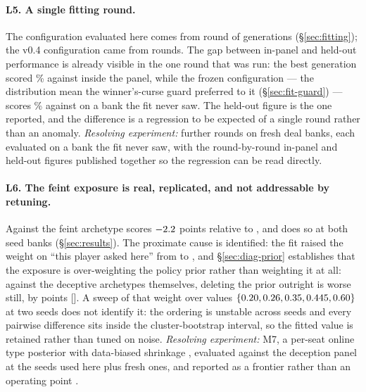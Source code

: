 \paragraph{L5. A single fitting round.} The configuration evaluated here comes
from \numFitRounds{} round of \numFitGens{} generations
(\S\ref{sec:fitting}); the v0.4 configuration came from
\numVfourFitRounds{} rounds.
The gap between in-panel and held-out performance is already visible in the one
round that was run: the best generation scored \numFitWorst\% against \vfour{}
inside the panel, while the frozen configuration --- the distribution mean the
winner's-curse guard preferred to it (\S\ref{sec:fit-guard}) --- scores
\numPanelVfiveVfour\% against \vfour{} on a bank the fit never saw.
The held-out figure is the one reported, and the difference is a regression to be
expected of a single round rather than an anomaly. \emph{Resolving experiment:}
further rounds on fresh deal banks, each evaluated on a bank the fit never saw,
with the round-by-round in-panel and held-out figures published together so the
regression can be read directly.

\paragraph{L6. The feint exposure is real, replicated, and not addressable by
retuning.} Against the feint archetype \vfive{} scores $-2.2$
points relative to \vfour{}, and does so at both seed banks
(\S\ref{sec:results}). The proximate
cause is identified: the fit raised the weight on ``this player asked here'' from
\numPriorThetaFour{} to \numPriorThetaFive{}, and \S\ref{sec:diag-prior}
establishes that the exposure is over-weighting the policy prior rather than
weighting it at all: against the deceptive archetypes themselves, deleting the
prior outright is worse still, by
\numPriorDeleteCost{} points [\numPriorDeleteCI]. A sweep of that weight over \numThetaSweepN{} values
$\{0.20, 0.26, 0.35, 0.445, 0.60\}$ at two seeds does not identify it: the ordering is unstable
across seeds and every pairwise difference sits inside the cluster-bootstrap
interval, so the fitted value is retained rather than tuned on noise.
\emph{Resolving experiment:} M7, a per-seat online type posterior with
data-biased shrinkage \cite{johanson-dbr}, evaluated against the deception panel
at the seeds used here plus fresh ones, and reported as a frontier rather than an
operating point \cite{johanson-rnash}.

